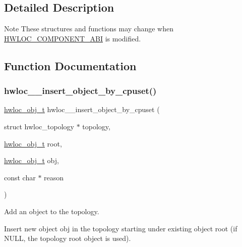 \subsection{Detailed Description}
\begin{DoxyNote}{Note}
These structures and functions may change when \hyperlink{a00182_gaac5bc1f46f55e10ef0141a68ce70e21f}{H\+W\+L\+O\+C\+\_\+\+C\+O\+M\+P\+O\+N\+E\+N\+T\+\_\+\+A\+BI} is modified. 
\end{DoxyNote}


\subsection{Function Documentation}
\mbox{\label{a00230_ga1e105cfe3c8e77f34cc6df3841deebbc}} 
\subsubsection{\texorpdfstring{hwloc\+\_\+\+\_\+insert\+\_\+object\+\_\+by\+\_\+cpuset()}{hwloc\_\_insert\_object\_by\_cpuset()}}
{\footnotesize\ttfamily \hyperlink{a00185_ga79b8ab56877ef99ac59b833203391c7d}{hwloc\+\_\+obj\+\_\+t} hwloc\+\_\+\+\_\+insert\+\_\+object\+\_\+by\+\_\+cpuset (\begin{DoxyParamCaption}\item[{struct hwloc\+\_\+topology $\ast$}]{topology,  }\item[{\hyperlink{a00185_ga79b8ab56877ef99ac59b833203391c7d}{hwloc\+\_\+obj\+\_\+t}}]{root,  }\item[{\hyperlink{a00185_ga79b8ab56877ef99ac59b833203391c7d}{hwloc\+\_\+obj\+\_\+t}}]{obj,  }\item[{const char $\ast$}]{reason }\end{DoxyParamCaption})}



Add an object to the topology. 

Insert new object {\ttfamily obj} in the topology starting under existing object {\ttfamily root} (if {\ttfamily N\+U\+LL}, the topology root object is used).


